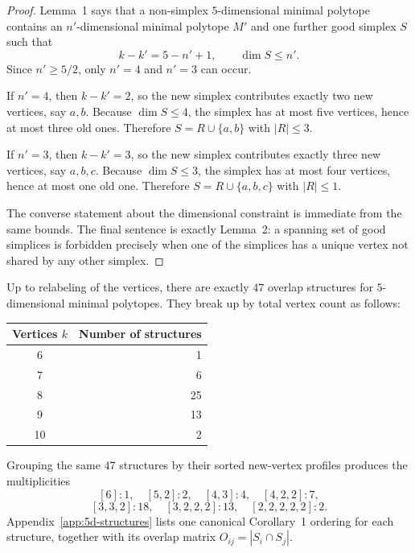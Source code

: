 \begin{proof}
Lemma~1 says that a non-simplex $5$-dimensional minimal polytope contains
an $n'$-dimensional minimal polytope $M'$ and one further good simplex $S$
such that
\[
  k-k' = 5-n'+1,
  \qquad
  \dim S \le n'.
\]
Since $n' \ge 5/2$, only $n'=4$ and $n'=3$ can occur.

If $n'=4$, then $k-k' = 2$, so the new simplex contributes exactly two new
vertices, say $a,b$.  Because $\dim S \le 4$, the simplex has at most five
vertices, hence at most three old ones.  Therefore
$S = R \cup \{a,b\}$ with $|R| \le 3$.

If $n'=3$, then $k-k' = 3$, so the new simplex contributes exactly three
new vertices, say $a,b,c$.  Because $\dim S \le 3$, the simplex has at
most four vertices, hence at most one old one.  Therefore
$S = R \cup \{a,b,c\}$ with $|R| \le 1$.

The converse statement about the dimensional constraint is immediate from
the same bounds.  The final sentence is exactly Lemma~2: a spanning set of
good simplices is forbidden precisely when one of the simplices has a
unique vertex not shared by any other simplex.
\end{proof}

\begin{theorem}
\label{thm:5d-structures}
Up to relabeling of the vertices, there are exactly $47$ overlap
structures for $5$-dimensional minimal polytopes.  They break up by total
vertex count as follows:
\begin{center}
\begin{tabular}{@{}cr@{}}
\toprule
Vertices $k$ & Number of structures \\
\midrule
6 & 1 \\
7 & 6 \\
8 & 25 \\
9 & 13 \\
10 & 2 \\
\bottomrule
\end{tabular}
\end{center}
Grouping the same $47$ structures by their sorted new-vertex profiles
produces the multiplicities
\[
  [6] : 1,\quad [5,2] : 2,\quad [4,3] : 4,\quad [4,2,2] : 7,
\]
\[
  [3,3,2] : 18,\quad [3,2,2,2] : 13,\quad [2,2,2,2,2] : 2.
\]
Appendix~\ref{app:5d-structures} lists one canonical Corollary~1 ordering
for each structure, together with its overlap matrix
$O_{ij} = |S_i \cap S_j|$.
\end{theorem}

